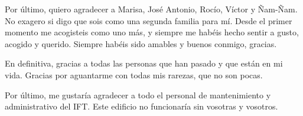 Por último, quiero agradecer a Marisa, José Antonio, Rocío, Víctor y Ñam-Ñam. No exagero si digo que sois como una segunda familia para mí. Desde el primer momento me acogisteis como uno más, y siempre me habéis hecho sentir a gusto, acogido y querido. Siempre habéis sido amables y buenos conmigo, gracias.

En definitiva, gracias a todas las personas que han pasado y que están en mi vida. Gracias por aguantarme con todas mis rarezas, que no son pocas. 

Por último, me gustaría agradecer a todo el personal de mantenimiento y administrativo del IFT. Este edificio no funcionaría sin vosotras y vosotros.

\bigskip

\endgroup
